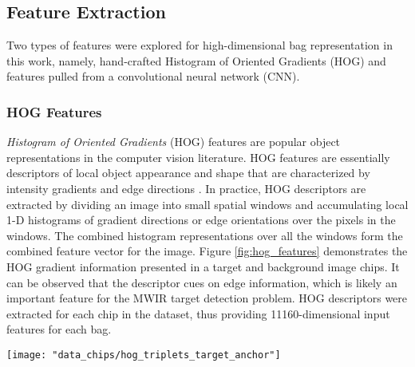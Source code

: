 \subsection{Feature Extraction}
Two types of features were explored for high-dimensional bag representation in this work, namely, hand-crafted Histogram of Oriented Gradients (HOG) and features pulled from a convolutional neural network (CNN).  

\subsubsection{HOG Features}

\textit{Histogram of Oriented Gradients} (HOG) features are popular object representations in the computer vision literature.  HOG features are essentially descriptors of local object appearance and shape that are characterized by intensity gradients and edge directions \citep{Dalal2005HOG}.  In practice, HOG descriptors are extracted by dividing an image into small spatial windows and accumulating local 1-D histograms of gradient directions or edge orientations over the pixels in the windows.  The combined histogram representations over all the windows form the combined feature vector for the image.  Figure \ref{fig:hog_features} demonstrates the HOG gradient information presented in a target and background image chips.  It can be observed that the descriptor cues on edge information, which is likely an important feature for the MWIR target detection problem.  HOG descriptors were extracted for each chip in the dataset, thus providing 11160-dimensional input features for each bag.  

\begin{center}
	\begin{figure*}[h]
		\centering
		\texttt{[image: "data\_chips/hog\_triplets\_target\_anchor"]}
		\caption[HOG features]{Example image chips and corresponding HOG gradient magnitude and direction features over the chip.  In the left column, the chips labeled as ``Anchor" and ``Positive" correspond to positive bags, while th image labeled ``Negative" represents a negative bag because it only contains background pixels.  The images in the right column demonstrate edge direction and magnitude calculated over 16x16 windows across the images.}
		\label{fig:hog_features}
	\end{figure*}
\end{center}

